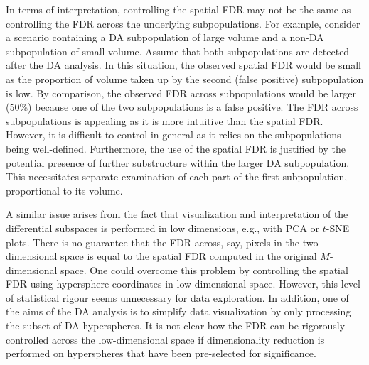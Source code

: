 \documentclass{article}
\begin{document}
In terms of interpretation, controlling the spatial FDR may not be the same as controlling the FDR across the underlying subpopulations.
For example, consider a scenario containing a DA subpopulation of large volume and a non-DA subpopulation of small volume.
Assume that both subpopulations are detected after the DA analysis.
In this situation, the observed spatial FDR would be small as the proportion of volume taken up by the second (false positive) subpopulation is low.
By comparison, the observed FDR across subpopulations would be larger (50\%) because one of the two subpopulations is a false positive.
The FDR across subpopulations is appealing as it is more intuitive than the spatial FDR.
However, it is difficult to control in general as it relies on the subpopulations being well-defined.
Furthermore, the use of the spatial FDR is justified by the potential presence of further substructure within the larger DA subpopulation.
This necessitates separate examination of each part of the first subpopulation, proportional to its volume.


A similar issue arises from the fact that visualization and interpretation of the differential subspaces is performed in low dimensions, e.g., with PCA or $t$-SNE plots.
There is no guarantee that the FDR across, say, pixels in the two-dimensional space is equal to the spatial FDR computed in the original $M$-dimensional space.
One could overcome this problem by controlling the spatial FDR using hypersphere coordinates in low-dimensional space.
However, this level of statistical rigour seems unnecessary for data exploration.
In addition, one of the aims of the DA analysis is to simplify data visualization by only processing the subset of DA hyperspheres.
It is not clear how the FDR can be rigorously controlled across the low-dimensional space if dimensionality reduction is performed on hyperspheres that have been pre-selected for significance.
\end{document}
